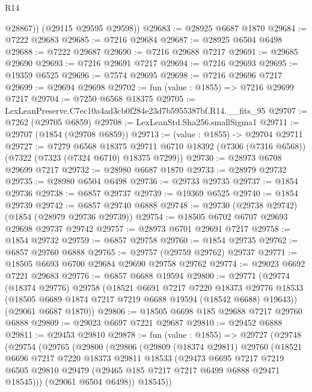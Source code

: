 \begin{lexlean}{R14}
\begin{coremodule}
          @28867))
      (@29115 @29595 @29598))
@29683 := @28925 @6687 @1870
@29684 := @7222 @29683
@29685 := @7216 @29684
@29687 := @28925 @6504 @6498
@29688 := @7222 @29687
@29690 := @7216 @29688 @7217
@29691 := @29685 @29690
@29693 := @7216 @29691 @7217
@29694 := @7216 @29693
@29695 := @19359 @6525
@29696 := @7574 @29695
@29698 := @7216 @29696 @7217
@29699 := @29694 @29698
@29702 := fun (value : @1855) => @7216 @29699 @7217
@29704 := @7250 @6568 @18375
@29705 := LexLeanPreserve.C7ec10a4ad3cb0f284e23d7b5955387bf.R14.__fits_95
@29707 := @7262 (@29705 @6859)
@29708 := LexLeanStd.Sha256.smallSigma1
@29711 := @29707 (@1854 (@29708 @6859))
@29713 := (value : @1855) -> @29704 @29711
@29727 := @7279
    @6568
    @18375
    @29711
    @6710
    @18392
    (@7306 (@7316 @6568))
    (@7322 (@7323 (@7324 @6710) @18375 @7299))
@29730 := @28973 @6708 @29699 @7217
@29732 := @28980 @6687 @1870
@29733 := @28979 @29732
@29735 := @28980 @6504 @6498
@29736 := @29733 @29735
@29737 := @1854 @29736
@29738 := @6857 @29737
@29739 := @19369 @6525
@29740 := @1854 @29739
@29742 := @6857 @29740 @6888
@29748 := @29730 (@29738 @29742) (@1854 (@28979 @29736 @29739))
@29754 := @18505 @6702 @6707 @29693 @29698 @29737 @29742
@29757 := @28973 @6701 @29691 @7217
@29758 := @1854 @29732
@29759 := @6857 @29758
@29760 := @1854 @29735
@29762 := @6857 @29760 @6888
@29765 := @29757 (@29759 @29762) @29737
@29771 := @18505 @6693 @6700 @29684 @29690 @29758 @29762
@29774 := @29023 @6692 @7221 @29683
@29776 := @6857 @6688 @19594
@29800 := @29771
    (@29774
      (@18374 @29776)
      @29758
      (@18521
        @6691
        @7217
        @7220
        @18373
        @29776
        @18533
        (@18505 @6689 @1874 @7217 @7219 @6688 @19594 (@18542 @6688) @19643))
      (@29061 @6687 @1870))
@29806 := @18505 @6698 @185 @29688 @7217 @29760 @6888
@29809 := @29023 @6697 @7221 @29687
@29810 := @29452 @6888
@29811 := @29453 @29810
@29878 := fun (value : @1855) =>
  @29727
    (@29748
      (@29754
        (@29765
          (@29800
            (@29806
              (@29809
                (@18374 @29811)
                @29760
                (@18521
                  @6696
                  @7217
                  @7220
                  @18373
                  @29811
                  @18533
                  (@29473
                    @6695
                    @7217
                    @7219
                    @6505
                    @29810
                    @29479
                    (@29465 @185 @7217 @7217 @6499 @6888 @29471 @18545)))
                (@29061 @6504 @6498))
              @18545))

\end{coremodule}
\end{lexlean}
